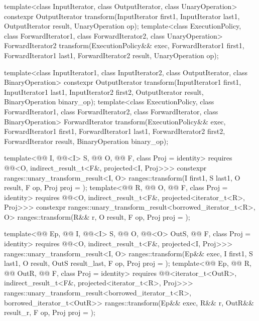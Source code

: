 %
\begin{itemdecl}
template<class InputIterator, class OutputIterator,
         class UnaryOperation>
  constexpr OutputIterator
    transform(InputIterator first1, InputIterator last1,
              OutputIterator result, UnaryOperation op);
template<class ExecutionPolicy, class ForwardIterator1, class ForwardIterator2,
         class UnaryOperation>
  ForwardIterator2
    transform(ExecutionPolicy&& exec,
              ForwardIterator1 first1, ForwardIterator1 last1,
              ForwardIterator2 result, UnaryOperation op);

template<class InputIterator1, class InputIterator2,
         class OutputIterator, class BinaryOperation>
  constexpr OutputIterator
    transform(InputIterator1 first1, InputIterator1 last1,
              InputIterator2 first2, OutputIterator result,
              BinaryOperation binary_op);
template<class ExecutionPolicy, class ForwardIterator1, class ForwardIterator2,
         class ForwardIterator, class BinaryOperation>
  ForwardIterator
    transform(ExecutionPolicy&& exec,
              ForwardIterator1 first1, ForwardIterator1 last1,
              ForwardIterator2 first2, ForwardIterator result,
              BinaryOperation binary_op);

template<@@ I, @@<I> S, @@ O,
         @@ F, class Proj = identity>
  requires @@<O, indirect_result_t<F&, projected<I, Proj>>>
  constexpr ranges::unary_transform_result<I, O>
    ranges::transform(I first1, S last1, O result, F op, Proj proj = {});
template<@@ R, @@ O, @@ F,
         class Proj = identity>
  requires @@<O, indirect_result_t<F&, projected<iterator_t<R>, Proj>>>
  constexpr ranges::unary_transform_result<borrowed_iterator_t<R>, O>
    ranges::transform(R&& r, O result, F op, Proj proj = {});

template<@@ Ep, @@ I, @@<I> S,
         @@ O, @@<O> OutS,
         @@ F, class Proj = identity>
  requires @@<O, indirect_result_t<F&, projected<I, Proj>>>
  ranges::unary_transform_result<I, O>
    ranges::transform(Ep&& exec, I first1, S last1, O result, OutS result_last,
                      F op, Proj proj = {});
template<@@ Ep, @@ R, @@ OutR,
         @@ F, class Proj = identity>
  requires @@<iterator_t<OutR>,
                               indirect_result_t<F&, projected<iterator_t<R>, Proj>>>
  ranges::unary_transform_result<borrowed_iterator_t<R>, borrowed_iterator_t<OutR>>
    ranges::transform(Ep&& exec, R&& r, OutR&& result_r, F op, Proj proj = {});


\end{itemdecl}
